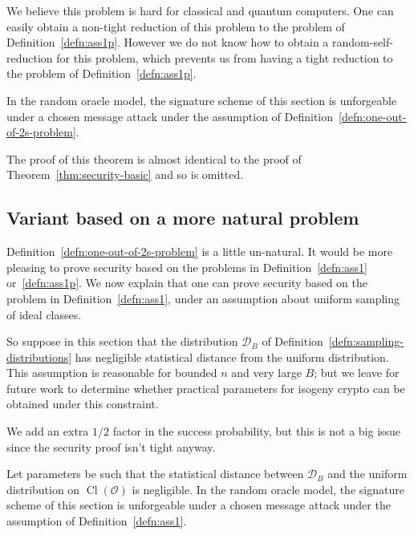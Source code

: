 \documentclass{llncs}
\newcommand{\D}{\mathcal{D}}
\newcommand{\OO}{\mathcal{O}}
\DeclareMathOperator{\Cl}{Cl}
\begin{document}
We believe this problem is hard for classical and quantum computers. One can easily obtain a non-tight reduction of this problem to the problem of Definition~\ref{defn:ass1p}.
However we do not know how to obtain a random-self-reduction for this problem, which prevents us from having a tight reduction to the problem of Definition~\ref{defn:ass1p}.


\begin{theorem}
In the random oracle model, the signature scheme of this section is unforgeable under a chosen message attack under the assumption of Definition~\ref{defn:one-out-of-2s-problem}.
\end{theorem}

The proof of this theorem is almost identical to the proof of Theorem~\ref{thm:security-basic} and so is omitted.



\subsection{Variant based on a more natural problem}


Definition~\ref{defn:one-out-of-2s-problem}  is a little un-natural.
It would be more pleasing to prove security based on the problems in Definition~\ref{defn:ass1} or~\ref{defn:ass1p}.
We now explain that one can prove security based on the problem in Definition~\ref{defn:ass1}, under an assumption about uniform sampling of ideal classes.

So suppose in this section that the distribution $\D_B$ of Definition~\ref{defn:sampling-distributions} has negligible statistical distance from the uniform distribution.
This assumption is reasonable for bounded $n$ and very large $B$; but we leave for future work to determine whether practical parameters for isogeny crypto can be obtained under this constraint.


We add an extra $1/2$ factor in the success probability, but this is not a big issue since the security proof isn't tight anyway.


\begin{theorem}
Let parameters be such that the statistical distance between $\D_B$ and the uniform distribution on $\Cl(\OO)$ is negligible.
In the random oracle model, the signature scheme of this section is unforgeable under a chosen message attack under the assumption of Definition~\ref{defn:ass1}.
\end{theorem}
\end{document}
